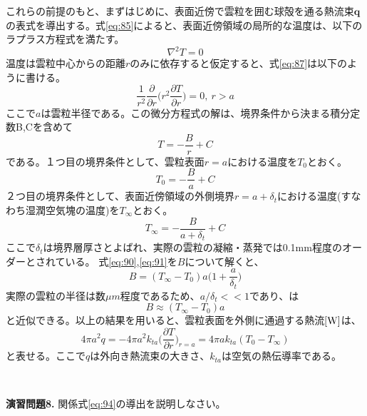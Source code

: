 \documentclass{ltjsarticle}
\begin{document}
これらの前提のもと、まずはじめに、表面近傍で雲粒を囲む球殻を通る熱流束$\bm{q}$の表式を導出する。式\eqref{eq:85}によると、表面近傍領域の局所的な温度は、以下のラプラス方程式を満たす。
\begin{equation}\label{eq:87}
\nabla^{2}T=0
\end{equation}
温度は雲粒中心からの距離$r$のみに依存すると仮定すると、式\eqref{eq:87}は以下のように書ける。
\begin{equation}\label{eq:88}
\frac{1}{r^2}\frac{\partial}{\partial r}{\bigg (}r^2 \frac{\partial T}{\partial r}{\bigg )}=0,\  r > a
\end{equation}
ここで$a$は雲粒半径である。この微分方程式の解は、境界条件から決まる積分定数B,Cを含めて
\begin{equation}\label{eq:89}
T=-\frac{B}{r}+C
\end{equation}
である。１つ目の境界条件として、雲粒表面$r=a$における温度を$T_{0}$とおく。
\begin{equation}\label{eq:90}
T_{0}=-\frac{B}{a}+C
\end{equation}
２つ目の境界条件として、表面近傍領域の外側境界$r=a+\delta_{t}$における温度(すなわち湿潤空気塊の温度)を$T_{\infty}$とおく。
\begin{equation}\label{eq:91}
T_{\infty}=-\frac{B}{a+\delta_{t}}+C
\end{equation}
ここで$\delta_{t}$は境界層厚さとよばれ、実際の雲粒の凝縮・蒸発では0.1mm程度のオーダーとされている。
式\eqref{eq:90},\eqref{eq:91}を$B$について解くと、
\begin{equation}\label{eq:92}
B=(T_{\infty}-T_{0})a{\bigg (} 1+\frac{a}{\delta_{t}} {\bigg )}
\end{equation}
実際の雲粒の半径は数$\mu m$程度であるため、$a/\delta_{t} << 1$であり、は
\begin{equation}\label{eq:93}
B\approx (T_{\infty}-T_{0})a
\end{equation}
と近似できる。以上の結果を用いると、雲粒表面を外側に通過する熱流$\rm[W]$は、
\begin{equation}\label{eq:94}
4\pi a^2 q = -4\pi a^2 k_{ta} {\bigg (}\frac{\partial T}{\partial r}{\bigg )}_{r=a} = 4\pi a k_{ta}(T_{0}-T_{\infty})
\end{equation}
と表せる。ここで$q$は外向き熱流束の大きさ、$k_{ta}$は空気の熱伝導率である。

\leavevmode \\
\begin{itembox}[l]{\bf{演習問題8.}}
関係式\eqref{eq:94}の導出を説明しなさい。
\end{itembox}
\\
\end{document}
